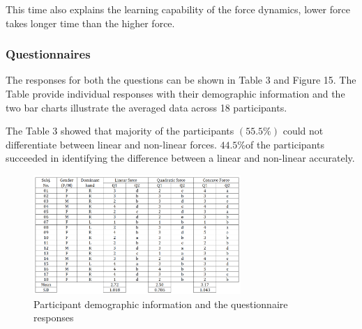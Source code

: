 	This time also explains the learning capability of the force dynamics, lower force takes longer time than the higher force.
	
	\subsubsection{Questionnaires}
	The responses for both the questions can be shown in Table 3 and Figure 15. The Table provide individual responses with their demographic information and the two bar charts illustrate the averaged data across 18 participants.
	
	The Table 3 showed that majority of the participants $(55.5\%)$ could not differentiate between linear and non-linear forces.  $44.5 \% $of the participants succeeded in identifying the difference between a linear and non-linear accurately.
	\begin{figure}
	\centering
	\includegraphics[width=0.7\textwidth]{Chie/figs/Table3.png}
	\caption{Participant demographic information and the questionnaire responses}
	\label{Table1}
\end{figure}

